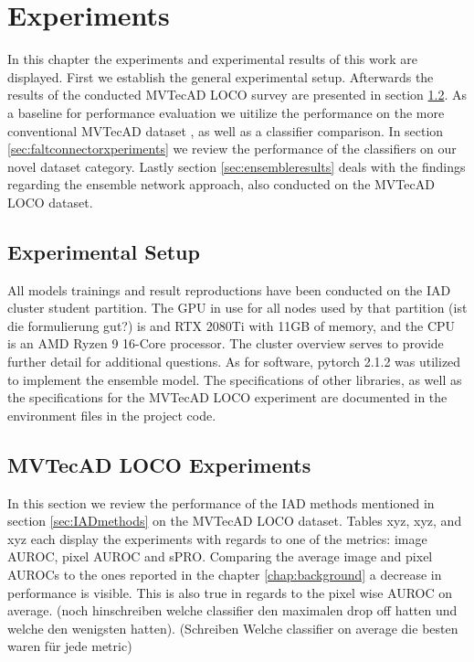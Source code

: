 \chapter{Experiments}
\label{chap:experiments}

In this chapter the experiments and experimental results of this work are displayed. First we establish the general experimental setup. Afterwards the results of the conducted MVTecAD LOCO \cite{LOCODentsAndScratchesBergmann2022}
survey are presented in section \ref{sec:locoxperiments}. As a baseline for performance evaluation we uitilize the performance on the more conventional MVTecAD dataset \cite{MVTEC_Bergmann_2021}, 
as well as a classifier comparison. In section \ref{sec:faltconnectorxperiments} we review the performance of the classifiers on our novel dataset category. Lastly section \ref{sec:ensembleresults} 
deals with the findings regarding the ensemble network approach, also conducted on the MVTecAD LOCO dataset.


\section{Experimental Setup}
\label{sec:experimentsetup}

All models trainings and result reproductions have been conducted on the IAD cluster student partition. The GPU in use for all nodes used by that partition (ist die formulierung gut?) is and 
RTX 2080Ti with 11GB of memory, and the CPU is an AMD Ryzen 9 16-Core processor. The cluster overview \cite{clusterdocs} serves to provide further detail for additional questions. As for software, 
pytorch 2.1.2 was utilized to implement the ensemble model. The specifications of other libraries, as well as the specifications for the MVTecAD LOCO experiment are documented in the 
environment files in the project code.



\section{MVTecAD LOCO Experiments}
\label{sec:locoxperiments}

In this section we review the performance of the IAD methods mentioned in section \ref{sec:IADmethods} on the MVTecAD LOCO \cite{LOCODentsAndScratchesBergmann2022} 
dataset. Tables xyz, xyz, and xyz each display the experiments with regards to one of the metrics: image AUROC, pixel AUROC and sPRO. \newline
Comparing the average image and pixel AUROCs to the ones reported in the chapter \ref{chap:background} a decrease in performance is visible. 
This is also true in regards to the pixel wise AUROC on average. (noch hinschreiben welche classifier den maximalen drop off hatten und 
welche den wenigsten hatten). (Schreiben Welche classifier on average die besten waren für jede metric)

